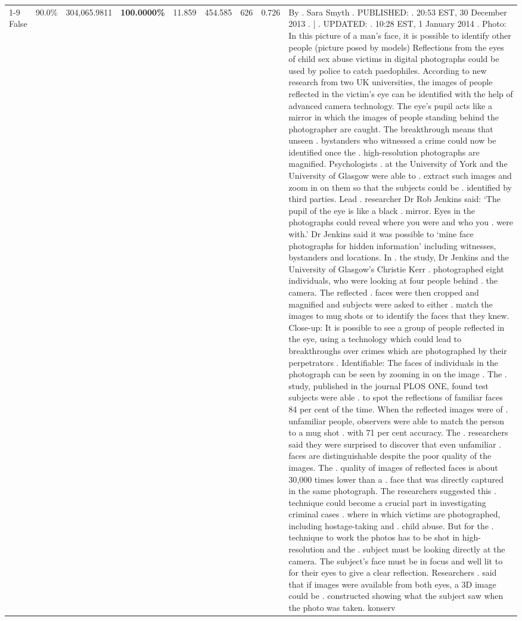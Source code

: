 \begin{table}[H]
\begin{tabular}{lllrlllll}
\cline{1-9}
False & 90.0\% & \color{red} 304,065.9811 & \bfseries \color{red} 100.0000\% & 11.859 & 454.585 & 626 & 0.726 & By . Sara Smyth . PUBLISHED: . 20:53 EST, 30 December 2013 . | . UPDATED: . 10:28 EST, 1 January 2014 . Photo: In this picture of a man's face, it is possible to identify other people (picture posed by models) Reflections from the eyes of child sex abuse victims in digital photographs could be used by police to catch paedophiles. According to new research from two UK universities, the images of people reflected in the victim's eye can be identified with the help of advanced camera technology. The eye's pupil acts like a mirror in which the images of people standing behind the photographer are caught. The breakthrough means that unseen . bystanders who witnessed a crime could now be identified once the . high-resolution photographs are magnified. Psychologists . at the University of York and the University of Glasgow were able to . extract such images and zoom in on them so that the subjects could be . identified by third parties. Lead . researcher Dr Rob Jenkins said: ‘The pupil of the eye is like a black . mirror. Eyes in the photographs could reveal where you were and who you . were with.' Dr Jenkins said it was possible to ‘mine face photographs for hidden information' including witnesses, bystanders and locations. In . the study, Dr Jenkins and the University of Glasgow's Christie Kerr . photographed eight individuals, who were looking at four people behind . the camera. The reflected . faces were then cropped and magnified and subjects were asked to either . match the images to mug shots or to identify the faces that they knew. Close-up: It is possible to see a group of people reflected in the eye, using a technology which could lead to breakthroughs over crimes which are photographed by their perpetrators . Identifiable: The faces of individuals in the photograph can be seen by zooming in on the image . The . study, published in the journal PLOS ONE, found test subjects were able . to spot the reflections of familiar faces 84 per cent of the time. When the reflected images were of . unfamiliar people, observers were able to match the person to a mug shot . with 71 per cent accuracy. The . researchers said they were surprised to discover that even unfamiliar . faces are distinguishable despite the poor quality of the images. The . quality of images of reflected faces is about 30,000 times lower than a . face that was directly captured in the same photograph. The researchers suggested this . technique could become a crucial part in investigating criminal cases . where in which victims are photographed, including hostage-taking and . child abuse. But for the . technique to work the photos has to be shot in high-resolution and the . subject must be looking directly at the camera. The subject's face must be in focus and well lit to for their eyes to give a clear reflection. Researchers . said that if images were available from both eyes, a 3D image could be . constructed showing what the subject saw when the photo was taken. konserv \\

\end{tabular}
\end{table}
